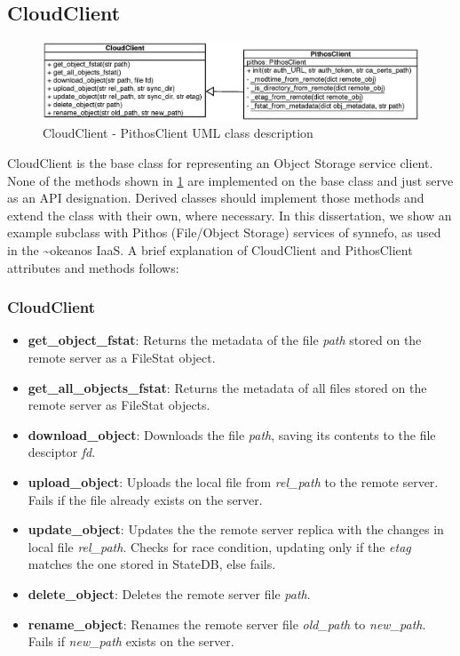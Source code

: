   \subsection{CloudClient}
    \label{ssec:cloudclient}
    \begin{figure}[!htpb]
      \centering
      \includegraphics[width=1.1\textwidth]{Images/CloudClient.eps}
      \caption{CloudClient - PithosClient UML class description}
      \label{fig:cloud_uml}
    \end{figure}
    CloudClient is the base class for representing an Object Storage service client. None of the methods shown in \ref{fig:cloud_uml} are implemented on the base class and just serve as an API designation. Derived classes should implement those methods and extend the class with their own, where necessary. In this dissertation, we show an example subclass with Pithos (File/Object Storage) services of synnefo, as used in the \textasciitilde okeanos IaaS. A brief explanation of CloudClient and PithosClient attributes and methods follows:
    \subsubsection{CloudClient}
      \begin{itemize}
        \item \textbf{get\_object\_fstat}: Returns the metadata of the file \emph{path} stored on the remote server as a FileStat object.
        \item \textbf{get\_all\_objects\_fstat}: Returns the metadata of all files stored on the remote server as FileStat objects.
        \item \textbf{download\_object}: Downloads the file \emph{path}, saving its contents to the file desciptor \emph{fd}.
        \item \textbf{upload\_object}: Uploads the local file from \emph{rel\_path} to the remote server. Fails if the file already exists on the server.
        \item \textbf{update\_object}: Updates the the remote server replica with the changes in local file \emph{rel\_path}. Checks for race condition, updating only if the \emph{etag} matches the one stored in StateDB, else fails.
        \item \textbf{delete\_object}: Deletes the remote server file \emph{path}.
        \item \textbf{rename\_object}: Renames the remote server file \emph{old\_path} to \emph{new\_path}. Fails if \emph{new\_path} exists on the server.
      \end{itemize}
